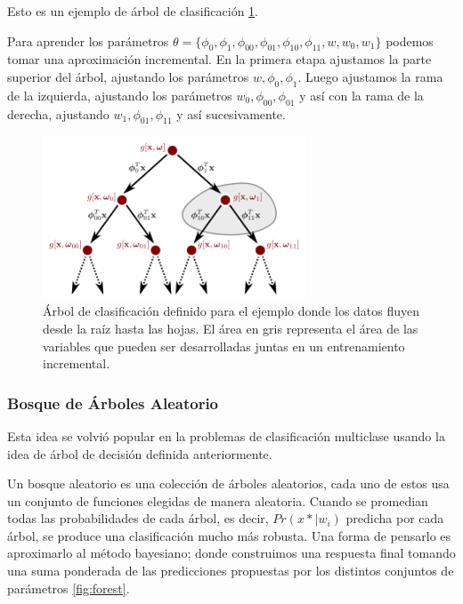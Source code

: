 \documentclass[letter,12pt]{report}
\begin{document}
Esto es un ejemplo de árbol de clasificación \ref{fig:tree}.

Para aprender los parámetros $\theta = \{\phi_0, \phi_1, \phi_{00}, \phi_{01}, \phi_{10},
\phi_{11}, w, w_0, w_1\}$ podemos tomar una aproximación incremental. En la primera etapa
ajustamos la parte superior del árbol, ajustando los parámetros $w, \phi_0, \phi_1$.
Luego ajustamos la rama de la izquierda, ajustando los parámetros $w_0, \phi_{00},
\phi_{01}$ y así con la rama de la derecha, ajustando $w_1, \phi_{01}, \phi_{11}$ y así
sucesivamente.

\begin{figure}[H]
    \centering
    \includegraphics[width=0.7\textwidth]{tree}
    \caption{Árbol de clasificación definido para el ejemplo donde los datos fluyen desde
        la raíz hasta las hojas. El área en gris representa el área de las variables que
    pueden ser desarrolladas juntas en un entrenamiento incremental.}
    \label{fig:tree}
\end{figure}

\subsubsection{Bosque de Árboles Aleatorio}
Esta idea se volvió popular en la problemas de clasificación multiclase usando la idea
de árbol de decisión definida anteriormente.

Un bosque aleatorio \cite{Forest} es una colección de árboles aleatorios, cada uno de
estos usa un conjunto de funciones elegidas de manera aleatoria. Cuando se promedian
todas las probabilidades de cada árbol, es decir, $Pr(x*|w_i)$ predicha por cada árbol, se
produce una clasificación mucho más robusta. Una forma de pensarlo es aproximarlo al
método bayesiano; donde construimos una respuesta final tomando una suma ponderada de las
predicciones propuestas por los distintos conjuntos de parámetros \ref{fig:forest}.
\end{document}
